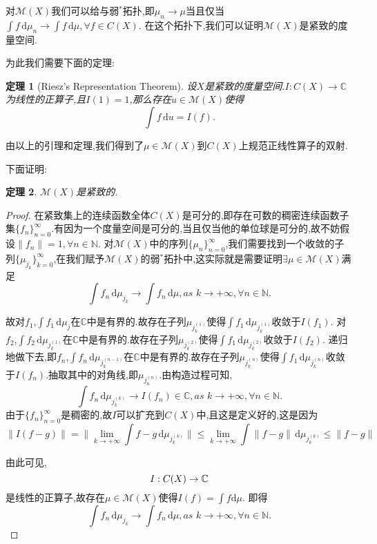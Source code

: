 \documentclass[a4paper,11pt,oneside]{book}
\newtheorem{theorem}{\textbf{\hspace{0.7cm}定理}}[section]
\begin{document}
对$\mathcal{M}(X)$我们可以给与弱$^*$拓扑,即$\mu_n\rightarrow \mu$当且仅当$\int\!f \, \mathrm{d}\mu_n\rightarrow \int\!f \, \mathrm{d}\mu,\forall f \in C(X)$.
在这个拓扑下,我们可以证明$\mathcal{M}(X)$是紧致的度量空间.

为此我们需要下面的定理:
\begin{theorem}[Riesz's Representation Theorem]

设$X$是紧致的度量空间.$I:C(X)\rightarrow \mathbb{C}$为线性的正算子,且$I(1)=1$,那么存在$u\in \mathcal{M}(X)$使得$$\int \!f\,\mathrm{d}u=I(f).$$

\end{theorem}

由以上的引理和定理,我们得到了$\mu\in \mathcal{M}(X)$到$C(X)$上规范正线性算子的双射.

下面证明:
\begin{theorem}
$\mathcal{M}(X)$是紧致的.
\end{theorem}

\begin{proof}
在紧致集上的连续函数全体$C(X)$是可分的,即存在可数的稠密连续函数子集$\{f_n\}_{n=0}^{\infty}$.有因为一个度量空间是可分的,当且仅当他的单位球是可分的,故不妨假设$\|f_n\|=1,\forall n\in \mathbb{N}$.
对$\mathcal{M}(X)$中的序列$\{\mu_n\}_{n=0}^{\infty}$,我们需要找到一个收敛的子列$\{\mu_{j_k}\}_{k=0}^{\infty}$,在我们赋予$\mathcal{M}(X)$的弱$^*$拓扑中,这实际就是需要证明$\exists \mu\in \mathcal{M}(X)$满足%
$$\int\! f_n \,\mathrm{d}\mu_{j_k}\rightarrow \int\! f_n \,\mathrm{d}\mu,as\,\, k\rightarrow +\infty,\forall n\in\mathbb{N}.$$

故对$f_1$,$\int\! f_1 \,\mathrm{d}\mu_j$在$\mathbb{C}$中是有界的.故存在子列$\mu_{j_k^{(1)}}$使得$\int\! f_1 \,\mathrm{d}\mu_{j_k^{(1)}}$收敛于$I(f_1)$.
对$f_2$,$\int\! f_2 \,\mathrm{d}\mu_{j_k^{(1)}}$在$\mathbb{C}$中是有界的.故存在子列$\mu_{j_k^{(2)}}$使得$\int\! f_1 \,\mathrm{d}\mu_{j_k^{(2)}}$收敛于$I(f_2)$.
递归地做下去,即$f_n$,$\int\! f_n \,\mathrm{d}\mu_{j_k^{(n-1)}}$在$\mathbb{C}$中是有界的.故存在子列$\mu_{j_k^{(n)}}$使得$\int\! f_1 \,\mathrm{d}\mu_{j_k^{(n)}}$收敛于$I(f_n)$.抽取其中的对角线,即$\mu_{j_n^{(n)}}$.由构造过程可知,%
$$\int\! f_n \,\mathrm{d}\mu_{j_k^{(k)}}\rightarrow I(f_n)\in\mathbb{C},as\,\, k\rightarrow +\infty,\forall n\in\mathbb{N}.$$
由于$\{f_n\}_{n=0}^{\infty}$是稠密的,故$I$可以扩充到$C(X)$中,且这是定义好的,这是因为$$\|I(f-g)\|=\|\lim_{k\to +\infty}\int\! f-g \,\mathrm{d}\mu_{j_k^{(k)}}\|\leq \lim_{k\to +\infty}\int\! \|f-g\| \,\mathrm{d}\mu_{j_k^{(k)}}\leq\|f-g\|$$

由此可见,
$$
I:C(X)\rightarrow \mathbb{C}\\
$$
是线性的正算子,故存在$\mu\in \mathcal{M}(X)$使得$I(f)=\int f \mathrm{d}\mu$.
即得$$\int\! f_n \,\mathrm{d}\mu_{j_k}\rightarrow \int\! f_n \,\mathrm{d}\mu,as\,\, k\rightarrow +\infty,\forall n\in\mathbb{N}.$$
\end{proof}
\end{document}

